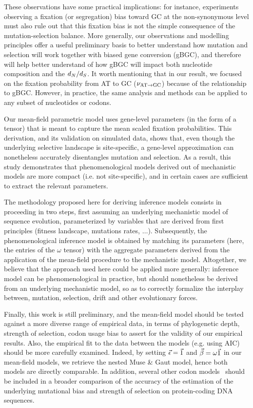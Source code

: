 These observations have some practical implications: for instance, experiments observing a fixation (or segregation) bias toward GC at the non-synonymous level must also rule out that this fixation bias is not the simple consequence of the mutation-selection balance.
More generally, our observations and modelling principles offer a useful preliminary basis to better understand how mutation and selection will work together with biased gene conversion (gBGC), and therefore will help better understand of how gBGC will impact both nucleotide composition and the $d_N / d_S$.
It worth mentioning that in our result, we focused on the fixation probability from AT to GC ($\nu_{\text{AT} \rightarrow \text{GC}}$) because of the relationship to gBGC.
However, in practice, the same analysis and methods can be applied to any subset of nucleotides or codons.

Our mean-field parametric model uses gene-level parameters (in the form of a tensor) that is meant to capture the mean scaled fixation probabilities.
This derivation, and its validation on simulated data, shows that, even though the underlying selective landscape is site-specific, a gene-level approximation can nonetheless accurately disentangles mutation and selection.
As a result, this study demonstrates that phenomenological models derived out of mechanistic models are more compact (i.e. not site-specific), and in certain cases are sufficient to extract the relevant parameters.

The methodology proposed here for deriving inference models consists in proceeding in two steps, first assuming an underlying mechanistic model of sequence evolution, parameterized by variables that are derived from first principles (fitness landscape, mutations rates, $\hdots$).
Subsequently, the phenomenological inference model is obtained by matching its parameters (here, the entries of the $\omega$ tensor) with the aggregate parameters derived from the application of the mean-field procedure to the mechanistic model.
Altogether, we believe that the approach used here could be applied more generally: inference model can be phenomenological in practice, but should nonetheless be derived from an underlying mechanistic model, so as to correctly formalize the interplay between, mutation, selection, drift and other evolutionary forces.

Finally, this work is still preliminary, and the mean-field model should be tested against a more diverse range of empirical data, in terms of phylogenetic depth, strength of selection, codon usage bias to assert for the validity of our empirical results.
Also, the empirical fit to the data between the models (e.g. using AIC) should be more carefully examined.
Indeed, by setting $\vec{\epsilon} = \vec{1}$ and $\vec{\beta} = \omega \vec{1}$ in our mean-field models, we retrieve the nested Muse \& Gaut model, hence both models are directly comparable.
In addition, several other codon models~\citep{Rodrigue2008a,KosakovskyPond2020} should be included in a broader comparison of the accuracy of the estimation of the underlying mutational bias and strength of selection on protein-coding DNA sequences.


